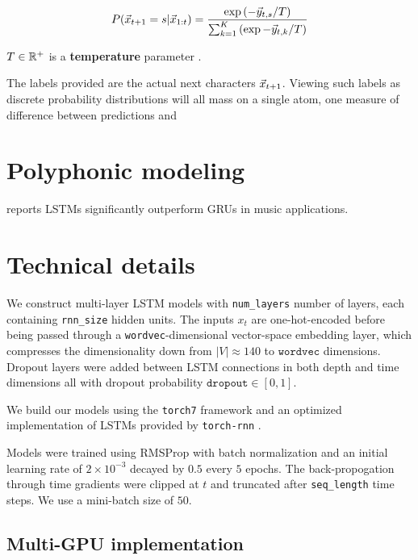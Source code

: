 \documentclass[dissertation.tex]{subfiles}
\begin{document}
\begin{equation}
    \label{eq:boltzmann-dist}
    P(\vec{x}_{t+1} = s | \vec{x}_{1:t})
    = \frac{\exp \left(-\vec{y}_{t,s}/T\right) }{ \sum_{k=1}^{K} \left(\exp -\vec{y}_{t,k}/T\right)}
\end{equation}

$T \in \mathbb{R}^+$ is a \textbf{temperature} parameter .

The labels provided are the actual next characters $\vec{x}_{t+1}$. Viewing
such labels as discrete probability distributions will all mass on a single atom,
one measure of difference between predictions and 

\section{Polyphonic modeling}

\cite{Nayebi2015} reports LSTMs significantly
outperform GRUs in music applications.

\section{Technical details}


We construct multi-layer LSTM models with \texttt{num\_layers} number of
layers, each containing \texttt{rnn\_size} hidden units. The inputs $x_t$ are
one-hot-encoded before being passed through a \texttt{wordvec}-dimensional
vector-space embedding layer, which compresses the dimensionality down from
$|V| \approx 140$ to $\texttt{wordvec}$ dimensions. Dropout layers were added
between LSTM connections in both depth and time dimensions all with dropout
probability $\texttt{dropout} \in [0,1]$.

We build our models using the \texttt{torch7} framework and
an optimized implementation of LSTMs provided by \texttt{torch-rnn} .

Models were trained using RMSProp  with batch normalization 
and an initial learning rate of $2 \times 10^{-3}$ decayed by $0.5$ every $5$
epochs. The back-propogation through time gradients were clipped
at $t$  and truncated after \texttt{seq\_length} time steps.
We use a mini-batch size of $50$.

\subsection{Multi-GPU implementation}
\end{document}
